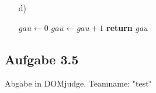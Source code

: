 \documentclass{article}
\begin{document}
\begin{enumerate}
        \item[d)] \hfill
        \begin{algorithm}
            \begin{algorithmic}[1]
                \State $\textit{gau} \gets 0$
                            \State $\textit{gau} \gets \textit{gau}  + 1$
                        \EndIf
                    \EndFor
                \EndFor
                \State \textbf{return} \textit{gau}
                \EndProcedure
                \end{algorithmic}
        \end{algorithm}
    \end{enumerate}
    
    \subsection*{Aufgabe 3.5}
    Abgabe in DOMjudge. Teamname: "test"
\end{document}
